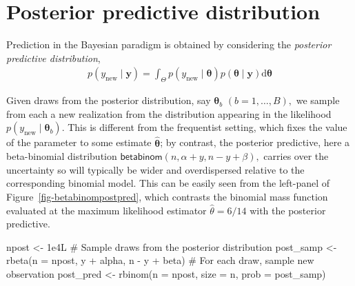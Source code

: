 \documentclass[
  11pt,
  letterpaper,
]{scrbook}
\newenvironment{Shaded}{\begin{snugshade}}{\end{snugshade}}
\newcommand{\AttributeTok}[1]{\textcolor[rgb]{0.40,0.45,0.13}{#1}}
\newcommand{\CommentTok}[1]{\textcolor[rgb]{0.37,0.37,0.37}{#1}}
\newcommand{\FloatTok}[1]{\textcolor[rgb]{0.68,0.00,0.00}{#1}}
\newcommand{\FunctionTok}[1]{\textcolor[rgb]{0.28,0.35,0.67}{#1}}
\newcommand{\NormalTok}[1]{\textcolor[rgb]{0.00,0.23,0.31}{#1}}
\newcommand{\OtherTok}[1]{\textcolor[rgb]{0.00,0.23,0.31}{#1}}
\newcommand{\SpecialCharTok}[1]{\textcolor[rgb]{0.37,0.37,0.37}{#1}}
\theoremstyle{plain}
\theoremstyle{plain}
\theoremstyle{definition}
\theoremstyle{definition}
\theoremstyle{definition}
\theoremstyle{plain}
\theoremstyle{remark}
\begin{document}
\section{Posterior predictive
distribution}\label{posterior-predictive-distribution}

Prediction in the Bayesian paradigm is obtained by considering the
\emph{posterior predictive distribution}, \begin{align*}
p(y_{\text{new}} \mid \boldsymbol{y}) =
\int_{\Theta} p(y_{\text{new}}  \mid \boldsymbol{\theta}) p(\boldsymbol{\theta} \mid  \boldsymbol{y}) \mathrm{d} \boldsymbol{\theta}
\end{align*}

Given draws from the posterior distribution, say
\(\boldsymbol{\theta}_b\) \((b=1, \ldots, B),\) we sample from each a
new realization from the distribution appearing in the likelihood
\(p(y_{\text{new}}  \mid \boldsymbol{\theta}_b).\) This is different
from the frequentist setting, which fixes the value of the parameter to
some estimate \(\widehat{\boldsymbol{\theta}}\); by contrast, the
posterior predictive, here a beta-binomial distribution
\(\mathsf{beta binom}(n, \alpha + y, n - y + \beta),\) carries over the
uncertainty so will typically be wider and overdispersed relative to the
corresponding binomial model. This can be easily seen from the
left-panel of Figure~\ref{fig-betabinompostpred}, which contrasts the
binomial mass function evaluated at the maximum likelihood estimator
\(\widehat{\theta}=6/14\) with the posterior predictive.

\begin{Shaded}
\begin{Highlighting}[]
\NormalTok{npost }\OtherTok{\textless{}{-}} \FloatTok{1e4}\NormalTok{L}
\CommentTok{\# Sample draws from the posterior distribution}
\NormalTok{post\_samp }\OtherTok{\textless{}{-}} \FunctionTok{rbeta}\NormalTok{(}\AttributeTok{n =}\NormalTok{ npost, y }\SpecialCharTok{+}\NormalTok{ alpha, n }\SpecialCharTok{{-}}\NormalTok{ y }\SpecialCharTok{+}\NormalTok{ beta)}
\CommentTok{\# For each draw, sample new observation}
\NormalTok{post\_pred }\OtherTok{\textless{}{-}} \FunctionTok{rbinom}\NormalTok{(}\AttributeTok{n =}\NormalTok{ npost, }\AttributeTok{size =}\NormalTok{ n, }\AttributeTok{prob =}\NormalTok{ post\_samp)}
\end{Highlighting}
\end{Shaded}
\end{document}
